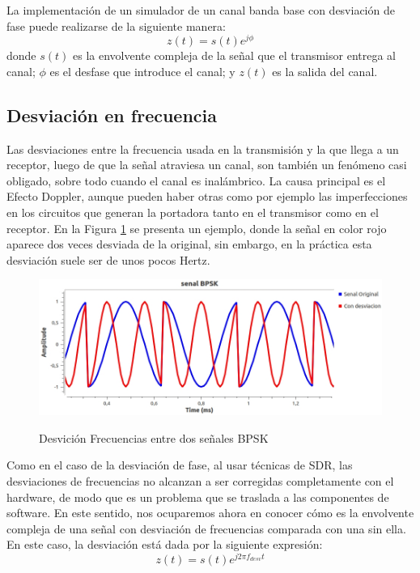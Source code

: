 La implementación de un simulador de un canal banda base con desviación de fase puede realizarse de la siguiente manera:
\begin{equation} \label{equ:p_dev}
	 z(t) = s(t)e^{j\phi}				
\end{equation}
donde $s(t)$ es la envolvente compleja de la señal que el transmisor entrega al canal; $\phi$ es el desfase que introduce el canal; y $z(t)$ es la salida del canal. 
\subsection{Desviación en frecuencia}
Las desviaciones entre la frecuencia usada en la transmisión y la que llega a un receptor, luego de que la señal atraviesa un canal, son también un fenómeno casi obligado, sobre todo cuando el canal es inalámbrico. La causa principal es el Efecto Doppler, aunque pueden haber otras como por ejemplo las imperfecciones en  los circuitos que generan la portadora tanto en el transmisor como en el receptor. En la Figura \ref{fig:bpsk_desv_frec} se presenta un ejemplo, donde la señal en color rojo aparece dos veces desviada de la original, sin embargo, en la práctica esta desviación suele ser de unos pocos Hertz.
\begin{figure}[h!]
	\captionsetup{justification = raggedright, singlelinecheck = false}
	\caption{Desvición Frecuencias entre dos señales BPSK} 
	\centering
	\includegraphics[scale=0.4]{Imagenes/bpsk_desv_frec.jpg}
	\label{fig:bpsk_desv_frec}
\end{figure}
Como en el caso de la desviación de fase, al usar técnicas de SDR, las desviaciones de frecuencias no alcanzan a ser corregidas completamente con el hardware, de modo que es un problema que se traslada a las componentes de software. En este sentido, nos ocuparemos ahora en conocer cómo es la envolvente compleja de una señal con desviación de frecuencias comparada con una sin ella. En este caso, la desviación está dada por la siguiente expresión: 
\begin{equation} \label{equ:f_dev}
	 z(t) = s(t)e^{j2\pi f_{desv} t}				
\end{equation}
